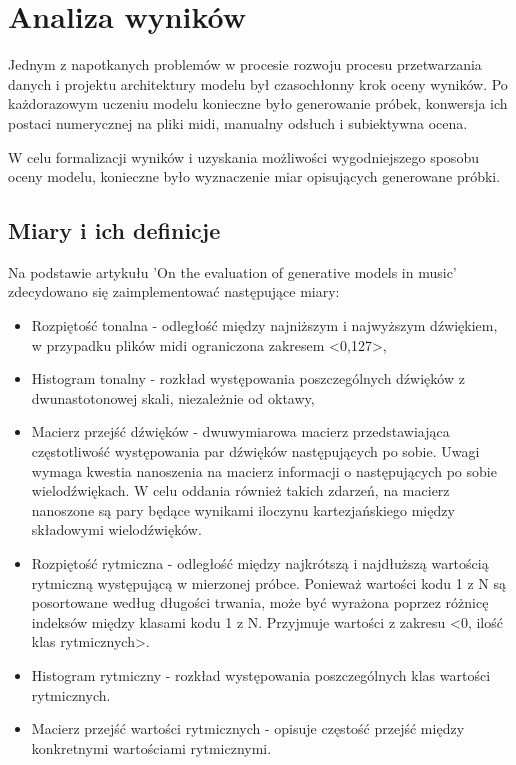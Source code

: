 \chapter{Analiza wyników}
{

    Jednym z napotkanych problemów w procesie rozwoju procesu przetwarzania danych i projektu architektury modelu
    był czasochłonny krok oceny wyników. Po każdorazowym uczeniu modelu konieczne było generowanie próbek, 
    konwersja ich postaci numerycznej na pliki midi, manualny odsłuch i subiektywna ocena.

    W celu formalizacji wyników i uzyskania możliwości wygodniejszego sposobu oceny modelu, konieczne było wyznaczenie
    miar opisujących generowane próbki. 

    \section{Miary i ich definicje}
    {
        Na podstawie artykułu 'On the evaluation of generative models in music'\cite{Yang2018OnTE} zdecydowano się zaimplementować następujące miary:
        \begin{itemize}
            \item Rozpiętość tonalna - odległość między najniższym i najwyższym dźwiękiem, w przypadku plików midi ograniczona
            zakresem <0,127>,
            \item Histogram tonalny - rozkład występowania poszczególnych dźwięków z dwunastotonowej skali, niezależnie od oktawy, 
            \item Macierz przejść dźwięków - dwuwymiarowa macierz przedstawiająca częstotliwość występowania par dźwięków następujących
            po sobie. Uwagi wymaga kwestia nanoszenia na macierz informacji o następujących po sobie wielodźwiękach. W celu oddania
            również takich zdarzeń, na macierz nanoszone są pary będące wynikami iloczynu kartezjańskiego między składowymi wielodźwięków.
            \item Rozpiętość rytmiczna - odległość między najkrótszą i najdłuższą wartością rytmiczną występującą w mierzonej próbce. 
            Ponieważ wartości kodu 1 z N są posortowane według długości trwania, może być wyrażona poprzez różnicę indeksów 
            między klasami kodu 1 z N. Przyjmuje wartości z zakresu <0, ilość klas rytmicznych>.
            \item Histogram rytmiczny - rozkład występowania poszczególnych klas wartości rytmicznych.
            \item Macierz przejść wartości rytmicznych - opisuje częstość przejść między konkretnymi wartościami rytmicznymi.
        \end{itemize}

}}
